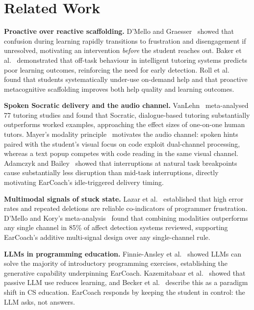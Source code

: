 \documentclass[sigconf,anonymous,review]{acmart}
\begin{document}
\section{Related Work}

\textbf{Proactive over reactive scaffolding.}
D'Mello and Graesser~\cite{dmello2012} showed that confusion during
learning rapidly transitions to frustration and disengagement if
unresolved, motivating an intervention \emph{before} the student reaches
out. Baker et al.~\cite{baker2004} demonstrated that off-task behaviour
in intelligent tutoring systems predicts poor learning outcomes,
reinforcing the need for early detection. Roll et al.~\cite{roll2011}
found that students systematically under-use on-demand help and that
proactive metacognitive scaffolding improves both help quality and
learning outcomes.

\textbf{Spoken Socratic delivery and the audio channel.}
VanLehn~\cite{vanlehn2011} meta-analysed 77 tutoring studies and found
that Socratic, dialogue-based tutoring substantially outperforms worked
examples, approaching the effect sizes of one-on-one human tutors.
Mayer's modality principle~\cite{mayer2009} motivates the audio channel:
spoken hints paired with the student's visual focus on code exploit
dual-channel processing, whereas a text popup competes with code reading
in the same visual channel. Adamczyk and Bailey~\cite{adamczyk2004}
showed that interruptions at natural task breakpoints cause substantially
less disruption than mid-task interruptions, directly motivating
EarCoach's idle-triggered delivery timing.

\textbf{Multimodal signals of stuck state.}
Lazar et al.~\cite{lazar2006} established that high error rates and
repeated deletions are reliable co-indicators of programmer frustration.
D'Mello and Kory's meta-analysis~\cite{dmellokory2015} found that
combining modalities outperforms any single channel in 85\% of affect
detection systems reviewed, supporting EarCoach's additive multi-signal
design over any single-channel rule.

\textbf{LLMs in programming education.}
Finnie-Ansley et al.~\cite{finnieansley2022} showed LLMs can solve the
majority of introductory programming exercises, establishing the
generative capability underpinning EarCoach. Kazemitabaar et
al.~\cite{kazemitabaar2023} showed that passive LLM use reduces
learning, and Becker et al.~\cite{becker2023} describe this as a
paradigm shift in CS education. EarCoach responds by keeping the student
in control: the LLM asks, not answers.
\end{document}
